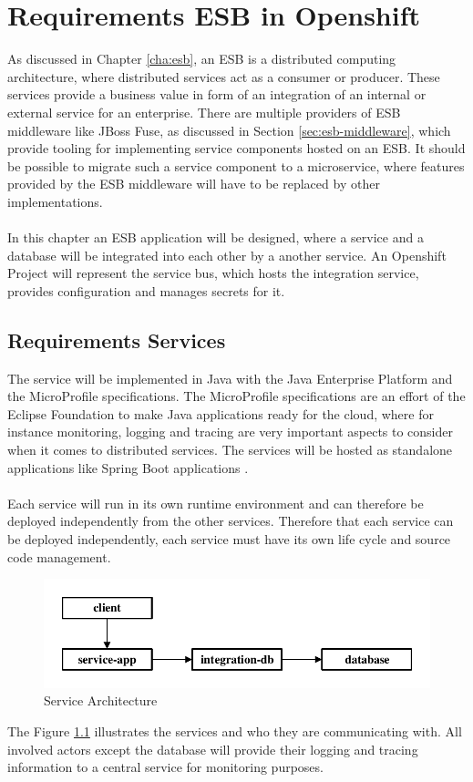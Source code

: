 \chapter{Requirements ESB in Openshift}
\label{cha:esboc}
As discussed in Chapter \ref{cha:esb}, an ESB is a distributed computing architecture, where distributed services act as a consumer or producer. These services provide a business value in form of an integration of an internal or external service for an enterprise. There are multiple providers of ESB middleware like JBoss Fuse, as discussed in Section \ref{sec:esb-middleware}, which provide tooling for implementing service components hosted on an ESB. It should be possible to migrate such a service component to a microservice, where features provided by the ESB middleware will have to be replaced by other implementations.
\\ \\
In this chapter an ESB application will be designed, where a service and a database will be integrated into each other by a another service. An Openshift Project will represent the service bus, which hosts the integration service, provides configuration and manages secrets for it.

\section{Requirements Services}
\label{sec:esboc-design-services}
The service will be implemented in Java with the Java Enterprise Platform and the MicroProfile specifications. The MicroProfile specifications are an effort of the Eclipse Foundation to make Java applications ready for the cloud, where for instance monitoring, logging and tracing are very important aspects to consider when it comes to distributed services. The services will be hosted as standalone applications like Spring Boot applications \cite{EclipseMicroprofileCharter2017, EclipseEE4JCharter2017}.
\\ \\
Each service will run in its own runtime environment and can therefore be deployed independently from the other services. Therefore that each service can be deployed independently, each service must have its own life cycle and source code management. 
\newpage

\begin{figure}[htbp]
	\centering
	\includegraphics[scale=1]{images/esboc-design-services.pdf}
	\caption{Service Architecture}
	\label{fig:esboc-design-services}
\end{figure} 
The Figure \ref{fig:esboc-design-services} illustrates the services and who they are communicating with. All involved actors except the database will provide their logging and tracing information to a central service for monitoring purposes.

